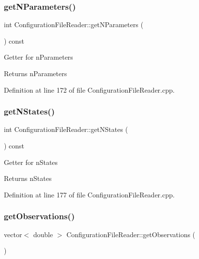 \subsubsection{\texorpdfstring{get\+N\+Parameters()}{getNParameters()}}
{\footnotesize\ttfamily int Configuration\+File\+Reader\+::get\+N\+Parameters (\begin{DoxyParamCaption}{ }\end{DoxyParamCaption}) const}

Getter for {\ttfamily n\+Parameters} \begin{DoxyReturn}{Returns}
{\ttfamily n\+Parameters} 
\end{DoxyReturn}


Definition at line 172 of file Configuration\+File\+Reader.\+cpp.

\mbox{\label{classConfigurationFileReader_a861fef6643dbc48d92b1eb18305a3931}} 
\subsubsection{\texorpdfstring{get\+N\+States()}{getNStates()}}
{\footnotesize\ttfamily int Configuration\+File\+Reader\+::get\+N\+States (\begin{DoxyParamCaption}{ }\end{DoxyParamCaption}) const}

Getter for {\ttfamily n\+States} \begin{DoxyReturn}{Returns}
{\ttfamily n\+States} 
\end{DoxyReturn}


Definition at line 177 of file Configuration\+File\+Reader.\+cpp.

\mbox{\label{classConfigurationFileReader_a1aa7cc335474bd1d15600f93e6de392b}} 
\subsubsection{\texorpdfstring{get\+Observations()}{getObservations()}}
{\footnotesize\ttfamily vector$<$ double $>$ Configuration\+File\+Reader\+::get\+Observations (\begin{DoxyParamCaption}{ }\end{DoxyParamCaption})}

